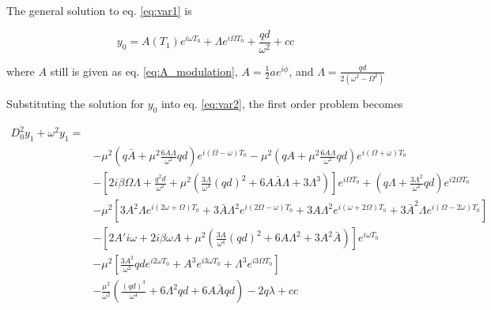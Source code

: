 The general solution to eq. \eqref{eq:var1} is

\begin{equation}
  \label{eq:y0_hard_resonans}
  y_0 = A(T_1)e^{i\omega T_0} + \Lambda e^{i\Omega T_0} + \frac{qd}{\omega^2} + cc
\end{equation}

where $A$ still is given as eq. \eqref{eq:A_modulation}, $A=\tfrac{1}{2}ae^{i \phi}$, and
$\Lambda = \tfrac{qd}{2(\omega^2 - \Omega^2)}$


Substituting the solution for $y_0$ into eq. \eqref{eq:var2}, the first order
problem becomes

\begin{equation}
\begin{split}
  D_{0}^{2} y_{1} + \omega^{2} y_{1} =&\\
  &-\mu^2\left(q\bar A + \mu^2\frac{6 \bar A \Lambda}{\omega^2}qd \right) e^{i(\Omega - \omega)T_0} %
  -\mu^2\left(qA + \mu^2\frac{6 A \Lambda}{\omega^2}qd \right)e^{i(\Omega + \omega)T_0} \\%
  &-\left[2i\beta\Omega\Lambda + \frac{q^2d}{\omega^2} + \mu^2\left( \frac{3 \Lambda}{\omega^4}(qd)^2 + 6A\bar A \Lambda + 3 \Lambda^3 \right)\right]e^{i\Omega T_0} %
+\left( q\Lambda +  \frac{ 3 \Lambda^2}{\omega^2}qd \right) e^{i2\Omega T_0}\\%
  &-\mu^2 \left[
  3A^2 \Lambda e^{i(2\omega + \Omega)T_0} %
  + 3\bar A \Lambda^2e^{i(2\Omega - \omega)T_0} %
  + 3A \Lambda^2e^{i(\omega + 2\Omega)T_0} %
  + 3 \bar A^2 \Lambda e^{i(\Omega - 2\omega)T_0} %
  \right] \\
  &-\left[2A'i \omega + 2i\beta\omega A  + \mu^2\left(\frac{3A}{\omega^4}(qd)^2 + 6A \Lambda^2 + 3 A^2\bar A  \right)\right] e^{i \omega T_0}\\ %
  &-\mu^2\left[
  \frac{3A^2}{\omega^2}qd e^{i2\omega T_0} %
  +A^3e^{i 3\omega T_0} %
  + \Lambda^3 e^{i 3\Omega T_0}  %
  \right]\\
  &-\frac{\mu^2}{\omega^2} \left(
  \frac{(qd)^3}{\omega^4} 
  +6\Lambda^2 qd
  +6 A \bar A qd
  \right)
  - 2q\lambda
  + cc
\end{split}
\label{eq:eps1_hard}
\end{equation}
